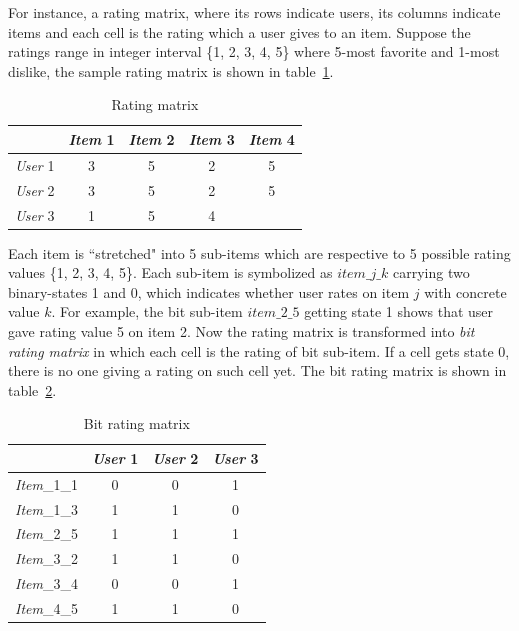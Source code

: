 \documentclass[10pt]{article}
\begin{document}
For instance, a rating matrix, where its rows indicate users, its columns indicate items and each cell is the rating which a user gives to an item. Suppose the ratings range in integer interval \{1, 2, 3, 4, 5\} where 5-most favorite and 1-most dislike, the sample rating matrix is shown in table~\ref{table:rating.matrix}.
\begin{table}
\centering
\caption{Rating matrix}
\begin{tabular}{|l|c|c|c|c|} \hline
&\textit{Item} 1&\textit{Item} 2&\textit{Item} 3&\textit{Item} 4\\ \hline
\textit{User} 1&3&5&2&5\\ \hline
\textit{User} 2&3&5&2&5\\ \hline
\textit{User} 3&1&5&4&\\ \hline
\end{tabular}
\label{table:rating.matrix}
\end{table}
Each item is ``stretched" into 5 sub-items which are respective to 5 possible rating values \{1, 2, 3, 4, 5\}. Each sub-item is symbolized as $item\_j\_k$ carrying two binary-states 1 and 0, which indicates whether user rates on item $j$ with concrete value $k$. For example, the bit sub-item $item\_2\_5$ getting state 1 shows that user gave rating value 5 on item 2. Now the rating matrix is transformed into \textit{bit rating matrix} in which each cell is the rating of bit sub-item. If a cell gets state 0, there is no one giving a rating on such cell yet. The bit rating matrix is shown in table~\ref{table:bit.rating.matrix}.
\begin{table}
\centering
\caption{Bit rating matrix}
\begin{tabular}{|l|c|c|c|} \hline
&\textit{User} 1&\textit{User} 2&\textit{User} 3\\ \hline
\textit{Item}\_1\_1&0&0&1\\ \hline
\textit{Item}\_1\_3&1&1&0\\ \hline
\textit{Item}\_2\_5&1&1&1\\ \hline
\textit{Item}\_3\_2&1&1&0\\ \hline
\textit{Item}\_3\_4&0&0&1\\ \hline
\textit{Item}\_4\_5&1&1&0\\ \hline
\end{tabular}
\label{table:bit.rating.matrix}
\end{table}
\end{document}
